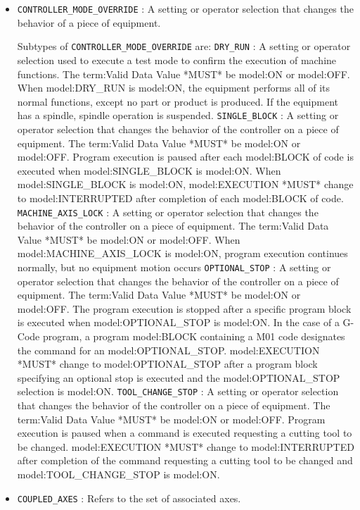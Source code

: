 \begin{itemize}
\item \texttt{CONTROLLER_MODE_OVERRIDE} : A setting or operator selection that changes the behavior of a piece of equipment. 

Subtypes of \texttt{CONTROLLER_MODE_OVERRIDE} are: 
\newline\tab \texttt{DRY_RUN} : A setting or operator selection used to execute a test mode to confirm the execution of machine functions. 
 The {term:Valid Data Value} *MUST* be {model:ON} or {model:OFF}. 
 When {model:DRY_RUN} is {model:ON}, the equipment performs all of its normal functions, except no part or product is produced.  If the equipment has a spindle, spindle operation is suspended. 
\newline\tab \texttt{SINGLE_BLOCK} : A setting or operator selection that changes the behavior of the controller on a piece of equipment. 
 The {term:Valid Data Value} *MUST* be {model:ON} or {model:OFF}.
 Program execution is paused after each {model:BLOCK} of code is executed when {model:SINGLE_BLOCK} is {model:ON}.   
 When {model:SINGLE_BLOCK} is {model:ON}, {model:EXECUTION} *MUST* change to {model:INTERRUPTED} after completion of each {model:BLOCK} of code.  
\newline\tab \texttt{MACHINE_AXIS_LOCK} : A setting or operator selection that changes the behavior of the controller on a piece of equipment. 
 The {term:Valid Data Value} *MUST* be {model:ON} or {model:OFF}. 
 When {model:MACHINE_AXIS_LOCK} is {model:ON}, program execution continues normally, but no equipment motion occurs  
\newline\tab \texttt{OPTIONAL_STOP} : A setting or operator selection that changes the behavior of the controller on a piece of equipment. 
 The {term:Valid Data Value} *MUST* be {model:ON} or {model:OFF}.
 The program execution is stopped after a specific program block is executed when {model:OPTIONAL_STOP} is {model:ON}.    
 In the case of a G-Code program, a program {model:BLOCK} containing a M01 code designates the command for an {model:OPTIONAL_STOP}. 
 {model:EXECUTION} *MUST* change to {model:OPTIONAL_STOP} after a program block specifying an optional stop is executed and the {model:OPTIONAL_STOP} selection is {model:ON}. 
\newline\tab \texttt{TOOL_CHANGE_STOP} : A setting or operator selection that changes the behavior of the controller on a piece of equipment. 
 The {term:Valid Data Value} *MUST* be {model:ON} or {model:OFF}. 
 Program execution is paused when a command is executed requesting a cutting tool to be changed. 
 {model:EXECUTION} *MUST* change to {model:INTERRUPTED} after completion of the command requesting a cutting tool to be changed and {model:TOOL_CHANGE_STOP} is {model:ON}. 
\item \texttt{COUPLED_AXES} : Refers to the set of associated axes. 


\end{itemize}

